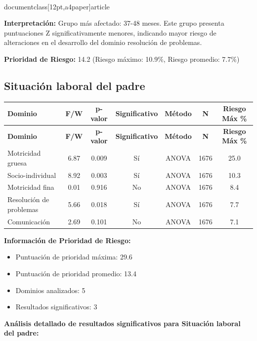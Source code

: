 \\documentclass[12pt,a4paper]{article}
\begin{document}
\textbf{Interpretación:} Grupo más afectado: 37-48 meses. Este grupo presenta puntuaciones Z significativamente menores, indicando mayor riesgo de alteraciones en el desarrollo del dominio resolución de problemas.

\textbf{Prioridad de Riesgo:} 14.2 (Riesgo máximo: 10.9\%, Riesgo promedio: 7.7\%)


\vspace{0.5cm}


\subsection{Situación laboral del padre}


\begin{longtable}{|l|c|c|c|c|c|c|}
\hline
\textbf{Dominio} & \textbf{F/W} & \textbf{p-valor} & \textbf{Significativo} & \textbf{Método} & \textbf{N} & \textbf{Riesgo Máx \%} \\
\hline
\endfirsthead

\hline
\textbf{Dominio} & \textbf{F/W} & \textbf{p-valor} & \textbf{Significativo} & \textbf{Método} & \textbf{N} & \textbf{Riesgo Máx \%} \\
\hline
\endhead

\hline
\endfoot

\hline
\endlastfoot

Motricidad gruesa & 6.87 & 0.009 & Sí & ANOVA & 1676 & 25.0 \\
Socio-individual & 8.92 & 0.003 & Sí & ANOVA & 1676 & 10.3 \\
Motricidad fina & 0.01 & 0.916 & No & ANOVA & 1676 & 8.4 \\
Resolución de problemas & 5.66 & 0.018 & Sí & ANOVA & 1676 & 7.7 \\
Comunicación & 2.69 & 0.101 & No & ANOVA & 1676 & 7.1 \\

\end{longtable}


\textbf{Información de Prioridad de Riesgo:}
\begin{itemize}
\item Puntuación de prioridad máxima: 29.6
\item Puntuación de prioridad promedio: 13.4
\item Dominios analizados: 5
\item Resultados significativos: 3
\end{itemize}


\textbf{Análisis detallado de resultados significativos para Situación laboral del padre:}
\end{document}
